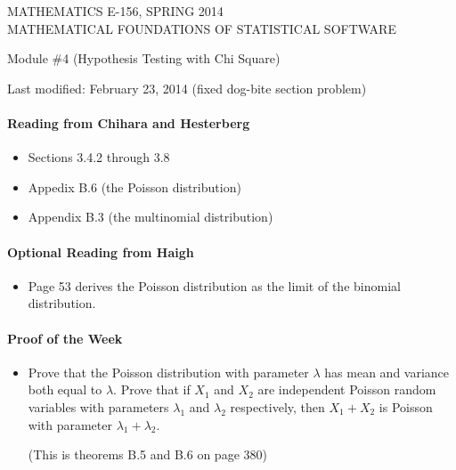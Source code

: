 \documentclass[12pt]{article}
\begin{document}
\begin{center}
MATHEMATICS E-156, SPRING 2014 \\
MATHEMATICAL FOUNDATIONS OF STATISTICAL SOFTWARE

\smallskip

Module \#4 (Hypothesis Testing with Chi Square)
\end{center}

Last modified: February 23, 2014 (fixed dog-bite section problem)

\medskip

\paragraph*{Reading from Chihara and Hesterberg}

\begin{itemize}
\item Sections 3.4.2 through 3.8

\item Appedix B.6 (the Poisson distribution)

\item Appendix B.3 (the multinomial distribution)
\end{itemize}

\paragraph*{Optional Reading from Haigh}

\begin{itemize}
\item Page 53 derives the Poisson distribution as the limit of the binomial distribution.
\end{itemize}


\paragraph*{Proof of the Week}
\begin{itemize}
\item Prove that the Poisson distribution with parameter $\lambda$ has mean and variance both equal to $\lambda$. Prove that if $X_1$ and $X_2$ are independent Poisson random variables with parameters $\lambda_1$ and $\lambda_2$ respectively, then $X_1 + X_2$ is Poisson with parameter $\lambda_1 + \lambda_2$.

(This is theorems B.5 and B.6 on page 380)
\end{itemize}
\end{document}
